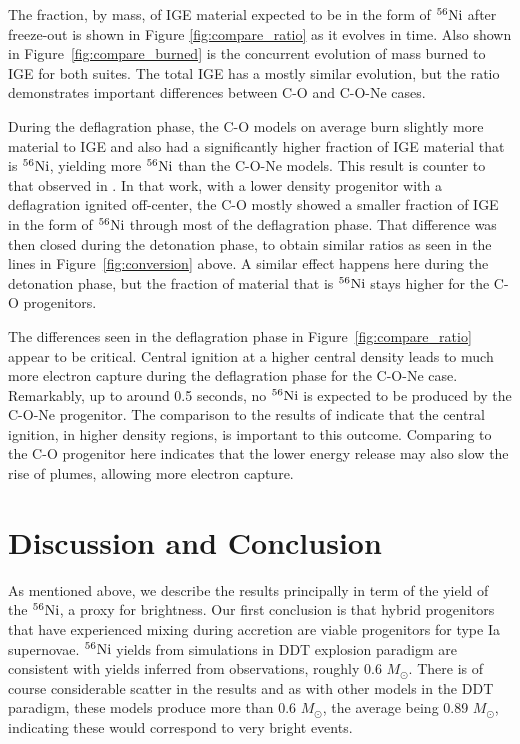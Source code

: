 \documentclass[preprint2]{aastex63}
\newcommand{\Ni}[1]{\ensuremath{{}^{#1}{\rm Ni}}}
\newcommand{\Msun}{\ensuremath{M_\odot}}
\begin{document}
The fraction, by mass, of IGE material expected to be in the form of \Ni{56} after freeze-out is shown in Figure \ref{fig:compare_ratio} as it evolves in time.
Also shown in Figure~\ref{fig:compare_burned} is the concurrent evolution of mass burned to IGE for both suites.
The total IGE has a mostly similar evolution, but the ratio demonstrates important differences between C-O and C-O-Ne cases.

During the deflagration phase, the C-O models
on average burn slightly more material to IGE and also had a significantly higher
fraction of IGE material that is \Ni{56}, yielding more \Ni{56} than
the C-O-Ne models. This result is counter to that observed in
\citet{willcoxetal2016}.
In that work, with a lower density progenitor with a deflagration ignited off-center, the C-O mostly showed a smaller fraction of IGE in the form of \Ni{56} through most of the deflagration phase.
That difference was then closed during the detonation phase, to obtain similar ratios as seen in the lines in Figure~\ref{fig:conversion} above.
A similar effect happens here during the detonation phase, but the fraction of material that is \Ni{56} stays higher for the C-O progenitors.

The differences seen in the deflagration phase in Figure~\ref{fig:compare_ratio} appear to be critical.
Central ignition at a higher central density leads to much more electron capture during the deflagration phase for the C-O-Ne case.
Remarkably, up to around 0.5 seconds, no \Ni{56} is expected to be produced by the C-O-Ne progenitor.
The comparison to the results of \citep{willcoxetal2016} indicate that the central ignition, in higher density regions, is important to this outcome.
Comparing to the C-O progenitor here indicates that the lower energy release may also slow the rise of plumes, allowing more electron capture.

\section{Discussion and Conclusion}



As mentioned above, we describe the results principally in term of the
yield of the \Ni{56}, a proxy for brightness.  Our first conclusion
is that hybrid progenitors that have experienced mixing during accretion are 
viable progenitors for type Ia supernovae. \Ni{56} yields from simulations
in DDT explosion paradigm are consistent with yields inferred from
observations, roughly 0.6 \Msun.  There is of course considerable scatter
in the results and as with other models in the DDT paradigm,
these models produce more than 0.6 \Msun, the average being 0.89 \Msun,
indicating these would correspond to very bright events.  
\end{document}
